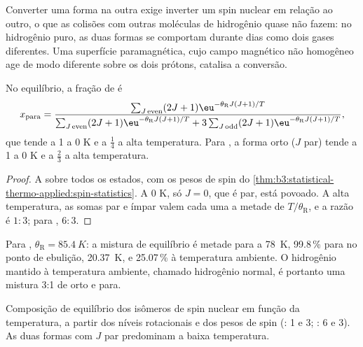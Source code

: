 Converter uma forma na outra exige inverter um spin nuclear em relação ao
outro, o que as colisões com outras moléculas de hidrogênio quase não fazem: no
hidrogênio puro, as duas formas se comportam durante dias como dois gases
diferentes. Uma superfície paramagnética, cujo campo magnético não homogêneo
age de modo diferente sobre os dois prótons, catalisa a conversão.

\begin{proposition}\label{prop:b3:statistical-thermo-applied:ortho-para}
No equilíbrio, a fração de  é
\[
  x_{\mathrm{para}} = \frac{\sum_{J\,\mathrm{even}}(2J+1)\eu^{-\theta_{\mathrm R}J(J+1)/T}}
    {\sum_{J\,\mathrm{even}}(2J+1)\eu^{-\theta_{\mathrm R}J(J+1)/T} + 3\sum_{J\,\mathrm{odd}}(2J+1)\eu^{-\theta_{\mathrm R}J(J+1)/T}},
\]
que tende a 1 a 0 K e a $\frac14$ a alta temperatura. Para , a forma orto
($J$ par) tende a 1 a 0 K e a $\frac23$ a alta temperatura.
\end{proposition}

\begin{proof}
A  sobre todos os estados, com os pesos de spin do
\cref{thm:b3:statistical-thermo-applied:spin-statistics}. A 0 K, só $J = 0$, que é
par, está povoado. A alta temperatura, as somas par e ímpar valem cada uma a
metade de $T/\theta_{\mathrm R}$, e a razão é $1 : 3$; para , $6 : 3$.
\end{proof}

Para , $\theta_{\mathrm R} = \qty{85.4}{K}$: a mistura de equilíbrio é metade para a \qty{78}{K},
99.8\,\% para no ponto de ebulição, \qty{20.37}{K}, e 25.07\,\% à temperatura
ambiente. O hidrogênio mantido à temperatura ambiente, chamado hidrogênio normal,
é portanto uma mistura 3:1 de orto e para.

\begin{omfigure}

{\small Composição de equilíbrio dos isômeros de spin nuclear em função da
temperatura, a partir dos níveis rotacionais e dos pesos de spin (: 1 e 3;
: 6 e 3). As duas formas com $J$ par predominam a baixa temperatura.}
\end{omfigure}


